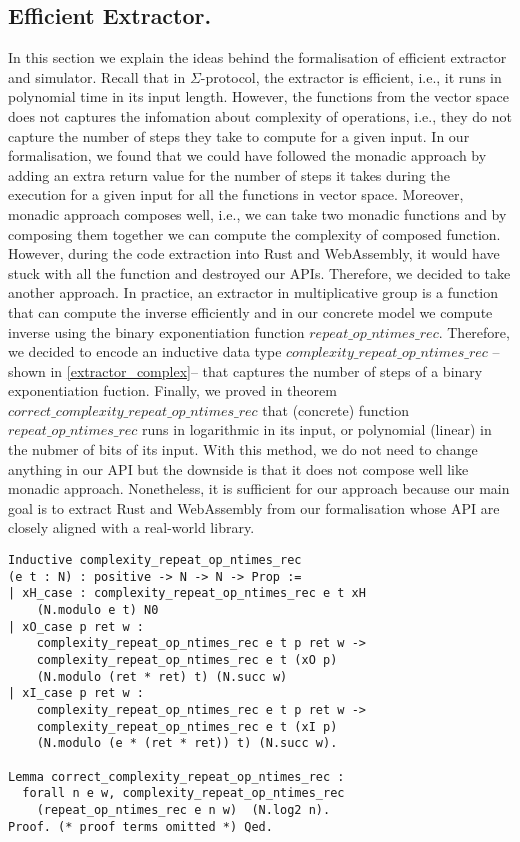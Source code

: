 \documentclass[conference,compsoc]{IEEEtran}
\begin{document}
\subsection{Efficient Extractor.}

In this section we explain the ideas behind the formalisation of 
efficient extractor and simulator. Recall that in $\Sigma$-protocol, 
the extractor is efficient, i.e., it runs in polynomial time in its input length.
However, the functions from the vector space does not captures the 
infomation about complexity of operations, i.e., they do not 
capture the number of steps they take to compute for a given input. 
In our formalisation, we found that we could have followed the 
monadic approach \cite{10.1145/3473585,10.1145/3158124} by adding an extra 
return value for the number of steps it takes during the 
execution for a given input for all the functions in vector space. 
Moreover, monadic approach composes well, i.e., we can take 
two monadic functions and by composing them together we 
can compute the complexity of composed function. However, 
during the code extraction into Rust and WebAssembly, it would 
have stuck with all the function and destroyed our APIs. 
Therefore, we decided to take another approach. 
In practice, an extractor in multiplicative group is 
a function that can compute the inverse efficiently and 
in our concrete model we compute inverse using 
the binary exponentiation function $repeat\_op\_ntimes\_rec$. 
Therefore, we decided to encode an inductive data type $complexity\_repeat\_op\_ntimes\_rec$ --shown in \ref{extractor_complex}--
that captures the number of steps of a binary exponentiation 
fuction. Finally, we proved in theorem $correct\_complexity\_repeat\_op\_ntimes\_rec$ that 
(concrete) function $repeat\_op\_ntimes\_rec$ runs in logarithmic in its input, or 
polynomial (linear) in the nubmer of bits of its input. With this method, 
we do not need to change anything in our API but the downside is that 
it does not compose well like monadic approach. Nonetheless, it is 
sufficient for our approach because our main goal is to extract 
Rust and WebAssembly from our formalisation whose API are closely 
aligned with a real-world library. 


\begin{lstlisting}[frame=single, language=Coq, caption={Extractor Complexity},
  label={extractor_complex},captionpos=t, basicstyle=\ttfamily\footnotesize,
  abovecaptionskip=-\medskipamount]
Inductive complexity_repeat_op_ntimes_rec 
(e t : N) : positive -> N -> N -> Prop :=
| xH_case : complexity_repeat_op_ntimes_rec e t xH 
    (N.modulo e t) N0
| xO_case p ret w : 
    complexity_repeat_op_ntimes_rec e t p ret w ->
    complexity_repeat_op_ntimes_rec e t (xO p) 
    (N.modulo (ret * ret) t) (N.succ w)
| xI_case p ret w : 
    complexity_repeat_op_ntimes_rec e t p ret w ->
    complexity_repeat_op_ntimes_rec e t (xI p) 
    (N.modulo (e * (ret * ret)) t) (N.succ w).

Lemma correct_complexity_repeat_op_ntimes_rec : 
  forall n e w, complexity_repeat_op_ntimes_rec 
    (repeat_op_ntimes_rec e n w)  (N.log2 n).
Proof. (* proof terms omitted *) Qed.
\end{lstlisting}
\end{document}
